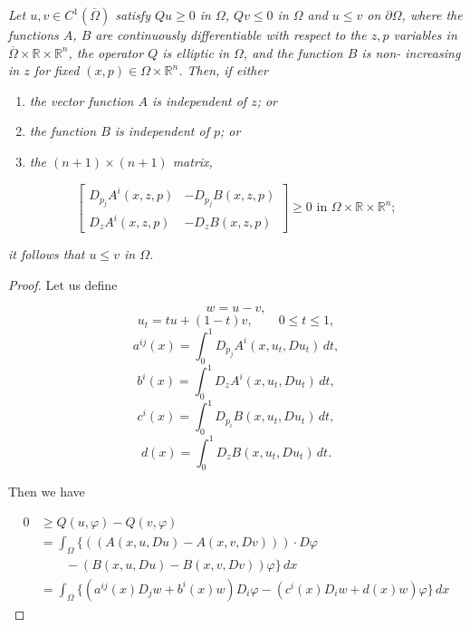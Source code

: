 \begin{theorem}\label{gilbarg-trudinger.thm.10.7.comparison-divergence-form}
\textit{Let $u,v\in C^1(\overline{\Omega})$ satisfy $Qu\ge 0$ in $\Omega$, $Qv\le 0$ in $\Omega$ and $u\le v$ on $\partial\Omega$,
where the functions $A$, $B$ are continuously differentiable with respect to the $z, p$
variables in $\overline{\Omega}\times\mathbb{R}\times\mathbb{R}^n$, the operator $Q$ is elliptic in $\Omega$, and the function $B$ is non-
increasing in $z$ for fixed $(x,p)\in\Omega\times\mathbb{R}^n$. Then, if either}

\begin{enumerate}
\item[(i)] \textit{the vector function $A$ is independent of $z$; or}
\item[(ii)] \textit{the function $B$ is independent of $p$; or}
\item[(iii)] \textit{the $(n+1)\times(n+1)$ matrix,}
\end{enumerate}

\[
\begin{bmatrix}
D_{p_j}A^i(x,z,p) & -D_{p_j}B(x,z,p)\\
D_z A^i(x,z,p) & -D_z B(x,z,p)
\end{bmatrix}\ge 0 \text{ in } \Omega\times\mathbb{R}\times\mathbb{R}^n;
\]

\textit{it follows that $u\le v$ in $\Omega$.}



\begin{proof}
Let us define

\[
w=u-v,
\]
\[
u_t=tu+(1-t)v,\qquad 0\le t\le 1,
\]
\[
a^{ij}(x)=\int_0^1 D_{p_j}A^i(x,u_t,Du_t)\,dt,
\]
\[
b^i(x)=\int_0^1 D_zA^i(x,u_t,Du_t)\,dt,
\]
\[
c^i(x)=\int_0^1 D_{p_i}B(x,u_t,Du_t)\,dt,
\]
\[
d(x)=\int_0^1 D_zB(x,u_t,Du_t)\,dt.
\]

Then we have

\begin{align*}
0 &\ge Q(u,\varphi)-Q(v,\varphi) \tag{10.22}\\
  &= \int_\Omega \{((A(x,u,Du)-A(x,v,Dv)))\cdot D\varphi \\
  &\qquad -(B(x,u,Du)-B(x,v,Dv))\varphi\}\,dx \\
  &= \int_\Omega \{(a^{ij}(x)D_jw+b^i(x)w)D_i\varphi-(c^i(x)D_iw+d(x)w)\varphi\}\,dx
\end{align*}


\end{proof}
\end{theorem}
